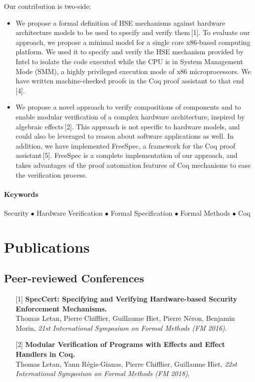 \documentclass{article}
\begin{document}
Our contribution is two-side:
%
\begin{itemize}
\item We propose a formal definition of HSE mechanisms against hardware
  architecture models to be used to specify and verify them\,[1].
  To evaluate our approach, we propose a minimal model for a single core
  x86-based computing platform.
  We used it to specify and verify the HSE mechanism provided by Intel to
  isolate the code executed while the CPU is in System Management Mode (SMM), a
  highly privileged execution mode of x86 microprocessors.
  We have written machine-checked proofs in the Coq proof assistant to that
  end\,[4].
\item We propose a novel approach to verify compositions of components and to
  enable modular verification of a complex hardware architecture, inspired by
  algebraic effects\,[2].
  This approach is not specific to hardware models, and could also be leveraged
  to reason about software applications as well.
  In addition, we have implemented FreeSpec, a framework for the Coq proof
  assistant\,[5].
  FreeSpec is a complete implementation of our approach, and takes advantages of
  the proof automation features of Coq mechanisms to ease the verification
  process.
\end{itemize}

\paragraph{Keywords}
%
Security $\bullet$ Hardware Verification $\bullet$ Formal Specification
$\bullet$ Formal Methods $\bullet$ Coq

\section{Publications}

\subsection{Peer-reviewed Conferences}

\begin{itemize}
\item[] [1] \textbf{SpecCert: Specifying and Verifying Hardware-based Security
    Enforcement
    Mechanisms.} \\
  Thomas Letan, Pierre Chifflier, Guillaume Hiet, Pierre Néron, Benjamin Morin,
  \emph{21st International Symposium on Formal Methods (FM 2016)}.
\item[] [2] \textbf{Modular Verification of Programs with Effects and Effect
    Handlers in Coq.} \\
  Thomas Letan, Yann Régis-Gianas, Pierre Chifflier, Guillaume Hiet, \emph{22st
    International Symposium on Formal Methods (FM 2018)}.
\end{itemize}
\end{document}
